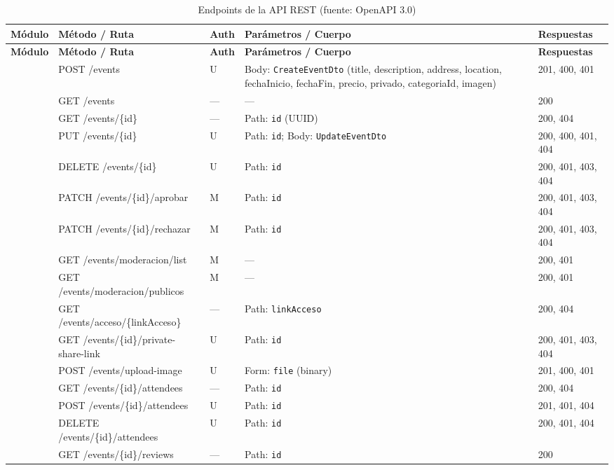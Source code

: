 \begin{longtable}{|p{1.5cm}|p{3.6cm}|p{0.8cm}|p{4cm}|p{2.8cm}|}
\caption{Endpoints de la API REST (fuente: OpenAPI 3.0)}\label{tab:api}\\
\hline
\textbf{Módulo} & \textbf{Método / Ruta} & \textbf{Auth} & \textbf{Parámetros / Cuerpo} & \textbf{Respuestas} \\
\hline
\endfirsthead
\hline
\textbf{Módulo} & \textbf{Método / Ruta} & \textbf{Auth} & \textbf{Parámetros / Cuerpo} & \textbf{Respuestas} \\
\hline
\endhead
\hline
\endlastfoot

\multirow{16}{=}{Eventos}
 & POST /events & U & Body: \texttt{CreateEventDto} (title, description, address, location, fechaInicio, fechaFin, precio, privado, categoriaId, imagen) & 201, 400, 401 \\
\cline{2-5}
 & GET /events & — & — & 200 \\
\cline{2-5}
 & GET /events/\{id\} & — & Path: \texttt{id} (UUID) & 200, 404 \\
\cline{2-5}
 & PUT /events/\{id\} & U & Path: \texttt{id}; Body: \texttt{UpdateEventDto} & 200, 400, 401, 404 \\
\cline{2-5}
 & DELETE /events/\{id\} & U & Path: \texttt{id} & 200, 401, 403, 404 \\
\cline{2-5}
 & PATCH /events/\{id\}/aprobar & M & Path: \texttt{id} & 200, 401, 403, 404 \\
\cline{2-5}
 & PATCH /events/\{id\}/rechazar & M & Path: \texttt{id} & 200, 401, 403, 404 \\
\cline{2-5}
 & GET /events/moderacion/list & M & — & 200, 401 \\
\cline{2-5}
 & GET /events/moderacion/publicos & M & — & 200, 401 \\
\cline{2-5}
 & GET /events/acceso/\{linkAcceso\} & — & Path: \texttt{linkAcceso} & 200, 404 \\
\cline{2-5}
 & GET /events/\{id\}/private-share-link & U & Path: \texttt{id} & 200, 401, 403, 404 \\
\cline{2-5}
 & POST /events/upload-image & U & Form: \texttt{file} (binary) & 201, 400, 401 \\
\cline{2-5}
 & GET /events/\{id\}/attendees & — & Path: \texttt{id} & 200, 404 \\
\cline{2-5}
 & POST /events/\{id\}/attendees & U & Path: \texttt{id} & 201, 401, 404 \\
\cline{2-5}
 & DELETE /events/\{id\}/attendees & U & Path: \texttt{id} & 200, 401, 404 \\
\cline{2-5}
 & GET /events/\{id\}/reviews & — & Path: \texttt{id} & 200 \\
\hline


\end{longtable}
